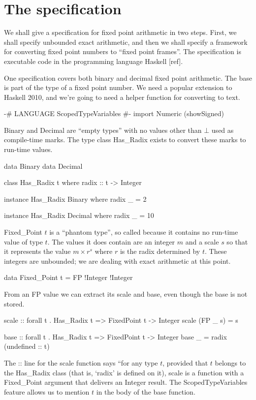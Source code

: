 \documentclass{article}
\begin{document}
\section{The specification}

We shall give a specification for fixed point arithmetic in two
steps.  First, we shall specify unbounded exact arithmetic, and
then we shall specify a framework for converting fixed point
numbers to ``fixed point frames''.  The specification is executable
code in the programming language Haskell [ref].

One specification covers both binary and decimal fixed point
arithmetic.  The base is part of the type of a fixed point number.
We need a popular extension to Haskell 2010, and we're going to
need a helper function for converting to text.
\begin{code}
{-# LANGUAGE ScopedTypeVariables #-}
import Numeric (showSigned)
\end{code}
Binary and Decimal are ``empty types'' with no values other
than $\bot$ used as compile-time marks.  The type class
Has\_Radix exists to convert these marks to run-time values.
\begin{code}
data Binary
data Decimal

class Has_Radix t
  where radix :: t -> Integer

instance Has_Radix Binary
  where radix _ = 2

instance Has_Radix Decimal
  where radix _ = 10
\end{code}

Fixed\_Point $t$ is a ``phantom type'', so called because it
contains no run-time value of type $t$.  The values it does
contain are an integer $m$ and a scale $s$ so that it represents
the value $m\times r^s$ where $r$ is the radix determined by $t$.
These integers are unbounded; we are dealing with exact arithmetic
at this point.
\begin{code}
data Fixed_Point t = FP !Integer !Integer
\end{code}

From an FP value we can extract its scale and base, even though
the base is not stored.
\begin{code}
scale :: forall t . Has_Radix t => FixedPoint t -> Integer
scale (FP _ s) = s

base :: forall t . Has_Radix t => FixedPoint t -> Integer
base _ = radix (undefined :: t)
\end{code}

The :: line for the scale function says ``for any type $t$,
provided that $t$ belongs to the Has\_Radix class (that is,
`radix' is defined on it), scale is a function with a
Fixed\_Point argument that delivers an Integer result.
The ScopedTypeVariables feature allows us to mention $t$ in
the body of the base function.
\end{document}
